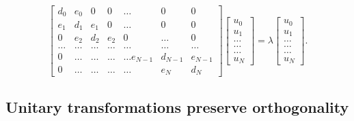 \documentclass[10pt,showpacs,preprintnumbers,footinbib,amsmath,amssymb,aps,prl,twocolumn,groupedaddress,superscriptaddress,showkeys]{revtex4-1}
\begin{document}
{\begin{equation*}
    \begin{bmatrix}d_0 & e_0 & 0   & 0    & \dots  &0     & 0 \\
                                e_1 & d_1 & e_1 & 0    & \dots  &0     &0 \\
                                0   & e_2 & d_2 & e_2  &0       &\dots & 0\\
                                \dots  & \dots & \dots & \dots  &\dots      &\dots & \dots\\
                                0   & \dots & \dots & \dots  &\dots  e_{N-1}     &d_{N-1} & e_{N-1}\\
                                0   & \dots & \dots & \dots  &\dots       &e_{N} & d_{N}
             \end{bmatrix}  \begin{bmatrix} u_{0} \\
                                                              u_{1} \\
                                                              \dots\\ \dots\\ \dots\\
                                                              u_{N}
             \end{bmatrix}=\lambda \begin{bmatrix} u_{0} \\
                                                              u_{1} \\
                                                              \dots\\ \dots\\ \dots\\
                                                              u_{N}
             \end{bmatrix}.  
\end{equation*}

\subsection{Unitary transformations preserve orthogonality}

}
\end{document}
